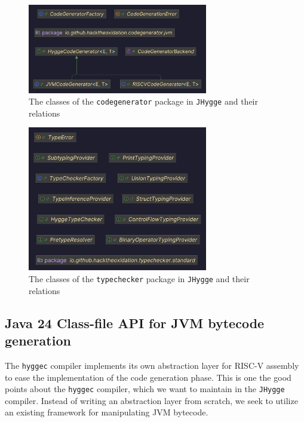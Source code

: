 \begin{figure}[H]
\centering
\includegraphics[width=0.7\textwidth]{Pictures/Diagrams/codegenerator_classes.png}
\caption{The classes of the \texttt{codegenerator} package in \texttt{JHygge} and their relations}
\label{fig:codegenerator_classes}
\end{figure}

\begin{figure}[H]
\centering
\includegraphics[width=0.7\textwidth]{Pictures/Diagrams/typechecker_classes.png}
\caption{The classes of the \texttt{typechecker} package in \texttt{JHygge} and their relations}
\label{fig:typechecker_classes}
\end{figure}

\subsection{Java 24 Class-file API for JVM bytecode generation}

The \texttt{hyggec} compiler implements its own abstraction layer for RISC-V assembly to ease the implementation of the code
generation phase. This is one the good points about the \texttt{hyggec} compiler, which we want to maintain in the \texttt{JHygge}
compiler. Instead of writing an abstraction layer from scratch, we seek to utilize an existing framework for manipulating JVM
bytecode.


